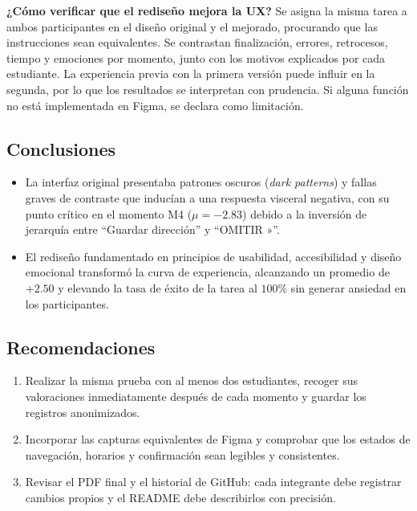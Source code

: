 \documentclass[10pt,letterpaper]{article}
\begin{document}
\textbf{¿Cómo verificar que el rediseño mejora la UX?} Se asigna la misma tarea a ambos participantes en el diseño original y el mejorado, procurando que las instrucciones sean equivalentes. Se contrastan finalización, errores, retrocesos, tiempo y emociones por momento, junto con los motivos explicados por cada estudiante. La experiencia previa con la primera versión puede influir en la segunda, por lo que los resultados se interpretan con prudencia. Si alguna función no está implementada en Figma, se declara como limitación.

\subsection{Conclusiones}
\begin{itemize}
    \item La interfaz original presentaba patrones oscuros (\emph{dark patterns}) y fallas graves de contraste que inducían a una respuesta visceral negativa, con su punto crítico en el momento M4 ($\mu = -2.83$) debido a la inversión de jerarquía entre ``Guardar dirección'' y ``OMITIR »''.
    \item El rediseño fundamentado en principios de usabilidad, accesibilidad y diseño emocional transformó la curva de experiencia, alcanzando un promedio de $+2.50$ y elevando la tasa de éxito de la tarea al $100\%$ sin generar ansiedad en los participantes.
\end{itemize}

\subsection{Recomendaciones}
\begin{enumerate}
\item Realizar la misma prueba con al menos dos estudiantes, recoger sus valoraciones inmediatamente después de cada momento y guardar los registros anonimizados.
\item Incorporar las capturas equivalentes de Figma y comprobar que los estados de navegación, horarios y confirmación sean legibles y consistentes.
\item Revisar el PDF final y el historial de GitHub: cada integrante debe registrar cambios propios y el README debe describirlos con precisión.
\end{enumerate}
\end{document}
